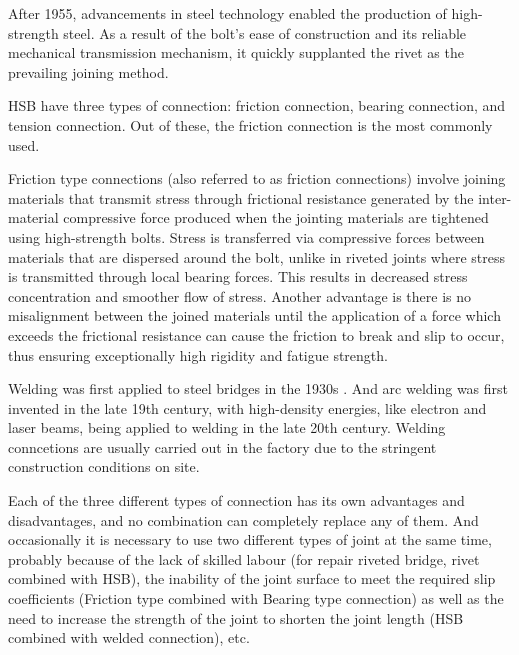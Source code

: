 After 1955, advancements in steel technology enabled the production of high-strength steel. As a result of the bolt's ease of construction and its reliable mechanical transmission mechanism, it quickly supplanted the rivet as the prevailing joining method.

\ac{HSB} have three types of connection: friction connection, bearing connection, and tension connection. Out of these, the friction connection is the most commonly used.

\ac{Friction type connections} (also referred to as friction connections) involve joining materials that transmit stress through frictional resistance generated by the inter-material compressive force produced when the jointing materials are tightened using high-strength bolts. Stress is transferred via compressive forces between materials that are dispersed around the bolt, unlike in riveted joints where stress is transmitted through local bearing forces. This results in decreased stress concentration and smoother flow of stress. Another advantage is there is no misalignment between the joined materials until the application of a force which exceeds the frictional resistance can cause the friction to break and slip to occur, thus ensuring exceptionally high rigidity and fatigue strength.

Welding was first applied to steel bridges in the 1930s \cite{ALENCAR2019154}. And arc welding was first invented in the late 19th century, with high-density energies, like electron and laser beams, being applied to welding in the late 20th century. Welding conncetions are usually carried out in the factory due to the stringent construction conditions on site.


Each of the three different types of connection has its own advantages and disadvantages, and no combination can completely replace any of them. And occasionally it is necessary to use two different types of joint at the same time, probably because of the lack of skilled labour (for repair riveted bridge, rivet combined with \ac{HSB}), the inability of the joint surface to meet the required slip coefficients (Friction type combined with Bearing type connection) as well as the need to increase the strength of the joint to shorten the joint length (\ac{HSB} combined with welded connection), etc.



